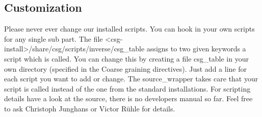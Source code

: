 \subsection{Customization}
Please never ever change our installed scripts. You can hook in your own scripts for any single sub part. The file
<csg-install>/share/csg/scripts/inverse/csg\_table assigns to two given keywords a script which is called. You can change this by creating a file
csg\_table in your own directory (specified in the Coarse graining directives). Just add a line for each script you want to add or change. The source\_wrapper takes care that your script is called instead of the one from the standard installations. For scripting details have a look at the source, there is no developers manual so far. Feel free to ask Christoph Junghans or Victor R\"uhle for details.
